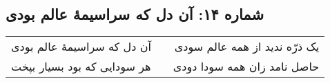 \begin{center}
\section*{شماره ۱۴: آن دل که سراسیمۀ عالم بودی}
\label{sec:014}
\begin{longtable}{l p{0.5cm} r}
آن دل که سراسیمهٔ عالم بودی
&&
یک ذرّه ندید از همه عالم سودی
\\
هر سودایی که بود بسیار بپخت
&&
حاصل نامد زان همه سودا دودی
\\
\end{longtable}
\end{center}
